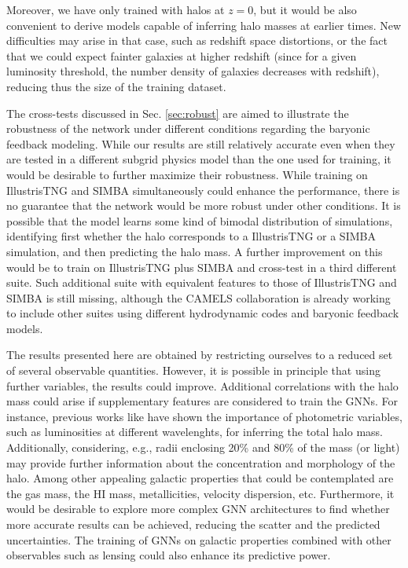 \documentclass[twocolumn]{aastex631}
\begin{document}
Moreover, we have only trained with halos at $z=0$, but it would be also convenient to derive models capable of inferring halo masses at earlier times. New difficulties may arise in that case, such as redshift space distortions, or the fact that we could expect fainter galaxies at higher redshift (since for a given luminosity threshold, the number density of galaxies decreases with redshift), reducing thus the size of the training dataset.

The cross-tests discussed in Sec. \ref{sec:robust} are aimed to illustrate the robustness of the network under different conditions regarding the baryonic feedback modeling. While our results are still relatively accurate even when they are tested in a different subgrid physics model than the one used for training, it would be desirable to further maximize their robustness. While training on IllustrisTNG and SIMBA simultaneously could enhance the performance, there is no guarantee that the network would be more robust under other conditions. It is possible that the model learns some kind of bimodal distribution of simulations, identifying first whether the halo corresponds to a IllustrisTNG or a SIMBA simulation, and then predicting the halo mass. A further improvement on this would be to train on IllustrisTNG plus SIMBA and cross-test in a third different suite. Such additional suite with equivalent features to those of IllustrisTNG and SIMBA is still missing, although the CAMELS collaboration is already working to include other suites using different hydrodynamic codes and baryonic feedback models.

The results presented here are obtained by restricting ourselves to a reduced set of several observable quantities. However, it is possible in principle that using further variables, the results could improve. Additional correlations with the halo mass could arise if supplementary features are considered to train the GNNs. For instance, previous works like \cite{2021arXiv211101185V} have shown the importance of photometric variables, such as luminosities at different wavelenghts, for inferring the total halo mass. Additionally, considering, e.g., radii enclosing 20\% and 80\% of the mass (or light) may provide further information about the concentration and morphology of the halo. Among other appealing galactic properties that could be contemplated are the gas mass, the HI mass, metallicities, velocity dispersion, etc. Furthermore, it would be desirable to explore more complex GNN architectures to find whether more accurate results can be achieved, reducing the scatter and the predicted uncertainties. The training of GNNs on galactic properties combined with other observables such as lensing could also enhance its predictive power.
\end{document}
